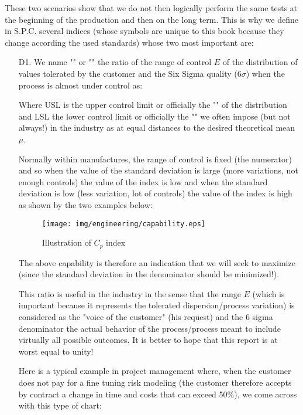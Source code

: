 These two scenarios show that we do not then logically perform the same  tests at the beginning of the production and then on the long term. This is why we define in S.P.C. several indices (whose symbols are unique to this book because they change according the used standards) whose two most important are:
	\begin{enumerate}
		\item[D1.] We name "" or "" the ratio of the range of control $E$  of the distribution of values tolerated by the customer and the Six Sigma quality ($6 \sigma$) when the process is almost under control as:
			
		Where USL is the upper control limit or officially the "" of the distribution and LSL the lower control limit or officially the "" we often impose (but not always!) in the industry as at equal distances to the desired theoretical mean $\mu$. 
		
		Normally within manufactures, the range of control is fixed (the numerator) and so when the value of the standard deviation is large (more variations, not enough controls) the value of the index is low and when the standard deviation is low (less variation, lot of controls) the value of the index is high as shown by the two examples below:
		
		\begin{figure}[H]
		\centering
		\texttt{[image: img/engineering/capability.eps]}
		\caption{Illustration of $C_p$ index}
		\end{figure}
		
		The above capability is therefore an indication that we will seek to maximize (since the standard deviation in the denominator should be minimized!).
		
		This ratio is useful in the industry in the sense that the range $E$ (which is important because it represents the tolerated dispersion/process variation) is considered as the "voice of the customer" (his request) and the 6 sigma denominator the actual behavior of the process/process meant to include virtually all possible outcomes. It is better to hope that this report is at worst equal to unity!
		
		Here is a typical example in project management where, when the customer does not pay for a fine tuning risk modeling (the customer therefore accepts by contract a change in time and costs that can exceed 50\%), we come across with this type of chart:
		

\end{enumerate}
